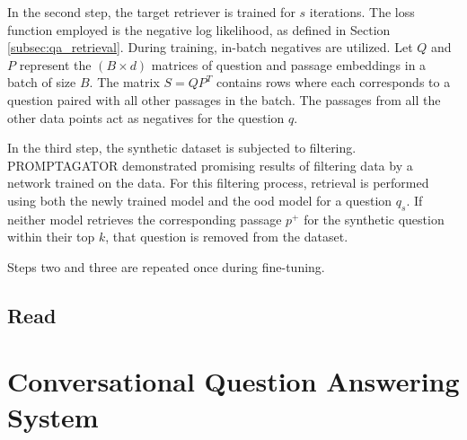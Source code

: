 In the second step, the target retriever is trained for $s$ iterations. The loss function employed is the negative log likelihood, as defined in Section \ref{subsec:qa_retrieval}. During training, in-batch negatives are utilized. Let $Q$ and $P$ represent the $(B \times d)$ matrices of question and passage embeddings in a batch of size $B$. The matrix $S = Q P^{T}$ contains rows where each corresponds to a question paired with all other passages in the batch. The passages from all the other data points act as negatives for the question $q$.

In the third step, the synthetic dataset is subjected to filtering. PROMPTAGATOR demonstrated promising results of filtering data by a network trained on the data. For this filtering process, retrieval is performed using both the newly trained model and the \gls{ood} model for a question $q_s$. If neither model retrieves the corresponding passage $p^{+}$ for the synthetic question within their top $k$, that question is removed from the dataset.

Steps two and three are repeated once during fine-tuning.
\subsection{Read}
\label{subsec:read}

\section{Conversational Question Answering System}
\label{sec:conv-qa-system}